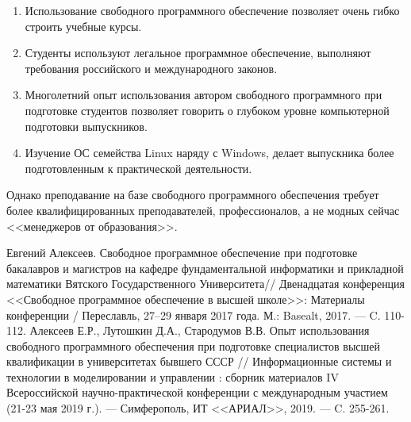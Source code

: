 \documentclass[10pt, a5paper]{article}
\begin{document}
\begin{enumerate}
  \item Использование свободного программного обеспечение позволяет очень гибко строить учебные курсы.
  \item Студенты используют легальное программное обеспечение, выполняют требования российского и международного законов.
  \item Многолетний опыт использования автором свободного программного при подготовке студентов позволяет говорить о глубоком уровне компьютерной подготовки выпускников.
  \item Изучение ОС семейства Linux наряду с Windows, делает выпускника более подготовленным к практической деятельности.
\end{enumerate}

Однако преподавание на базе свободного программного обеспечения требует более квалифицированных преподавателей, профессионалов, а не модных сейчас <<менеджеров от образования>>.


\begin{thebibliography}{9}
 {Евгений Алексеев. Свободное программное обеспечение при подготовке бакалавров и магистров на кафедре фундаментальной информатики и прикладной математики Вятского Государственного Университета// Двенадцатая конференция <<Свободное программное обеспечение в высшей школе>>: Материалы конференции / Переславль, 27–29 января 2017 года. М.: Basealt, 2017. --- C. 110-112.}
 {Алексеев Е.Р., Лутошкин Д.А., Стародумов В.В. Опыт использования свободного программного обеспечения при подготовке специалистов высшей квалификации в университетах бывшего СССР //  Информационные системы и технологии в моделировании и управлении : сборник материалов IV Всероссийской научно-практической конференции с международным участием (21-23 мая 2019 г.). --- Симферополь, ИТ <<АРИАЛ>>, 2019. ---  C. 255-261.}\end{thebibliography}
\end{document}
